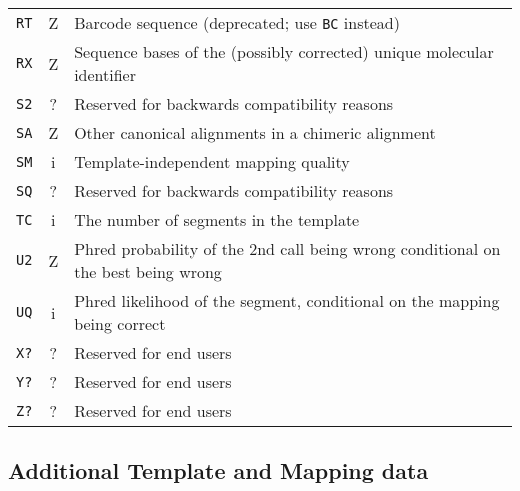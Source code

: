 \documentclass[10pt]{article}
\begin{document}
\begin{center}
\begin{longtable}{ccp{12.5cm}}
  {\tt RT} & Z & Barcode sequence (deprecated; use {\tt BC} instead) \\
  {\tt RX} & Z & Sequence bases of the (possibly corrected) unique molecular identifier \\
  {\tt S2} & ? & Reserved for backwards compatibility reasons \\
  {\tt SA} & Z & Other canonical alignments in a chimeric alignment \\
  {\tt SM} & i & Template-independent mapping quality \\
  {\tt SQ} & ? & Reserved for backwards compatibility reasons \\
  {\tt TC} & i & The number of segments in the template \\
  {\tt U2} & Z & Phred probability of the 2nd call being wrong conditional on the best being wrong \\
  {\tt UQ} & i & Phred likelihood of the segment, conditional on the mapping being correct \\
  {\tt X?} & ? & Reserved for end users \\
  {\tt Y?} & ? & Reserved for end users \\
  {\tt Z?} & ? & Reserved for end users \\
\hline
\end{longtable}
\end{center}

\subsection{Additional Template and Mapping data}
\end{document}
